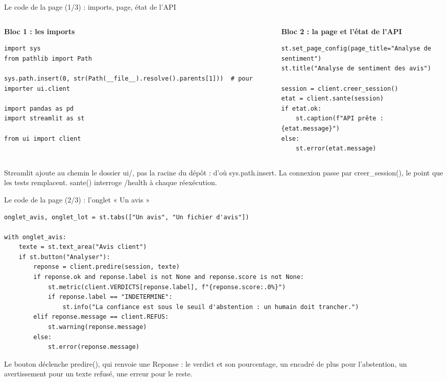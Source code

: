 \documentclass[aspectratio=169,11pt]{beamer}
\newcommand{\co}[1]{{\ttfamily\hyphenchar\font=45\relax #1}}
\begin{document}
\begin{frame}[fragile]{Le code de la page (1/3) : imports, page, état de l'API}
\begin{columns}[T]
\begin{column}{0.49\textwidth}
\scriptsize\textbf{Bloc 1 : les imports}
\begin{lstlisting}[basicstyle=\ttfamily\tiny]
import sys
from pathlib import Path

sys.path.insert(0, str(Path(__file__).resolve().parents[1]))  # pour importer ui.client

import pandas as pd
import streamlit as st

from ui import client
\end{lstlisting}
\end{column}
\begin{column}{0.49\textwidth}
\scriptsize\textbf{Bloc 2 : la page et l'état de l'API}
\begin{lstlisting}[basicstyle=\ttfamily\tiny]
st.set_page_config(page_title="Analyse de sentiment")
st.title("Analyse de sentiment des avis")

session = client.creer_session()
etat = client.sante(session)
if etat.ok:
    st.caption(f"API prête : {etat.message}")
else:
    st.error(etat.message)
\end{lstlisting}
\end{column}
\end{columns}
\medskip
\small Streamlit ajoute au chemin le dossier \co{ui/}, pas la racine du dépôt : d'où \co{sys.path.insert}. La
connexion passe par \co{creer\_session()}, le point que les tests remplacent. \co{sante()} interroge
\co{/health} à chaque réexécution.
\end{frame}

\begin{frame}[fragile]{Le code de la page (2/3) : l'onglet « Un avis »}
\begin{lstlisting}[basicstyle=\ttfamily\tiny]
onglet_avis, onglet_lot = st.tabs(["Un avis", "Un fichier d'avis"])

with onglet_avis:
    texte = st.text_area("Avis client")
    if st.button("Analyser"):
        reponse = client.predire(session, texte)
        if reponse.ok and reponse.label is not None and reponse.score is not None:
            st.metric(client.VERDICTS[reponse.label], f"{reponse.score:.0%}")
            if reponse.label == "INDETERMINE":
                st.info("La confiance est sous le seuil d'abstention : un humain doit trancher.")
        elif reponse.message == client.REFUS:
            st.warning(reponse.message)
        else:
            st.error(reponse.message)
\end{lstlisting}
\small Le bouton déclenche \co{predire()}, qui renvoie une \co{Reponse} : le verdict et son pourcentage,
un encadré de plus pour l'abstention, un avertissement pour un texte refusé, une erreur pour le reste.
\end{frame}
\end{document}
